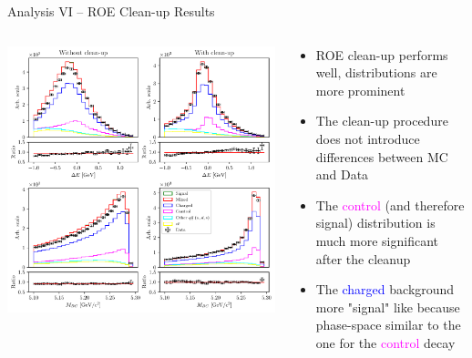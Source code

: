 \documentclass[serif]{beamer}
\begin{document}
\begin{frame}[t]{Analysis VI -- ROE Clean-up Results}
\vspace{-3mm}
\small

\begin{columns}
	\includegraphics[width=\textwidth]{fig/roe_val}
	\begin{block}{}
	\begin{itemize}
		\item ROE clean-up performs well, distributions are more prominent
		\item The clean-up procedure does not introduce differences between MC and Data
		\item The \textcolor{magenta}{control} (and therefore signal) distribution is much more significant after the cleanup
		\item The \textcolor{blue}{charged} background more "signal" like because phase-space similar to the one for the \textcolor{magenta}{control} decay
	\end{itemize}
	\end{block}
\end{columns}


\end{frame}

\end{document}
